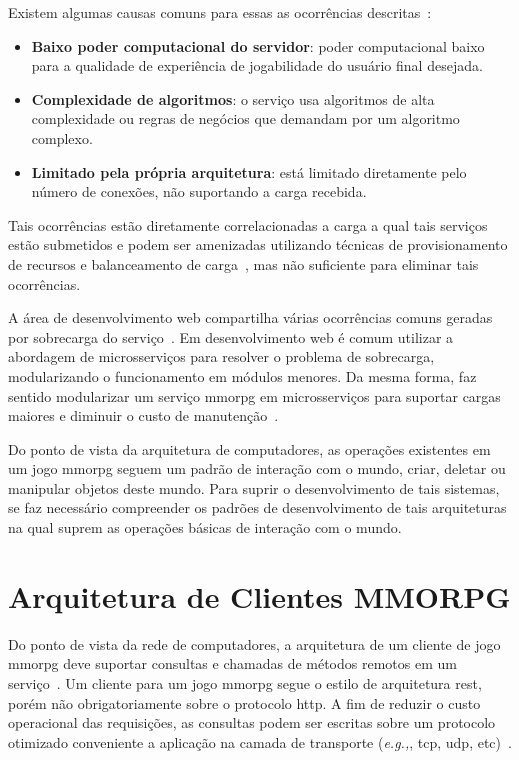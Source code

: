 Existem algumas causas comuns para essas as ocorrências descritas~\cite{1417630}:

\begin{itemize}
  \item \textbf{Baixo poder computacional do servidor}: poder computacional baixo para a qualidade de experiência de jogabilidade do usuário final desejada.
  \item \textbf{Complexidade de algoritmos}: o serviço usa algoritmos de alta complexidade ou regras de negócios que demandam por um algoritmo complexo.
  \item \textbf{Limitado pela própria arquitetura}: está limitado diretamente pelo número de conexões, não suportando a carga recebida.
\end{itemize}

Tais ocorrências estão diretamente correlacionadas a carga a qual tais serviços estão submetidos e podem ser amenizadas utilizando técnicas de provisionamento de recursos e balanceamento de carga~\cite{1417630}, mas não suficiente para eliminar tais ocorrências.

A área de desenvolvimento web compartilha várias ocorrências comuns geradas por sobrecarga do serviço~\cite{7830692}.
%
Em desenvolvimento web é comum utilizar a abordagem de microsserviços para resolver o problema de sobrecarga, modularizando o  funcionamento em módulos menores.
%
Da mesma forma, faz sentido modularizar um serviço \ac{mmorpg} em microsserviços para suportar cargas maiores e diminuir o custo de manutenção~\cite{7515686}.


Do ponto de vista da arquitetura de computadores, as operações existentes em um jogo \ac{mmorpg} seguem um padrão de interação com o mundo, criar, deletar ou manipular objetos deste mundo.
%
Para suprir o desenvolvimento de tais sistemas, se faz necessário compreender os padrões de desenvolvimento de tais arquiteturas na qual suprem as operações básicas de interação com o mundo.


\section{Arquitetura de Clientes MMORPG}
\label{sec:cliente}



Do ponto de vista da rede de computadores, a arquitetura de um cliente de jogo \ac{mmorpg} deve suportar consultas e chamadas de métodos remotos em um serviço~\cite{albion_online_unite}.
%
Um cliente para um jogo \ac{mmorpg} segue o estilo de arquitetura \ac{rest}, porém não obrigatoriamente sobre o protocolo \ac{http}. A fim de reduzir o custo operacional das requisições, as consultas podem ser escritas sobre um protocolo otimizado conveniente a aplicação na camada de transporte (\textit{e.g.,}, \ac{tcp}, \ac{udp}, etc)~\cite{albion_online_unite, stephenclarkewillson2017}.

